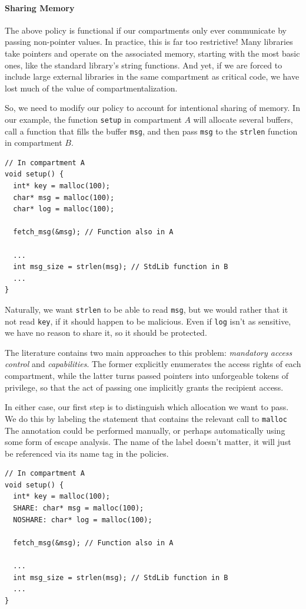 \documentclass[acmsmall,review,anonymous]{acmart}\settopmatter{printfolios=true,printccs=false,printacmref=false}
\begin{document}
\paragraph{Sharing Memory}

The above policy is functional if our compartments only ever communicate by passing
non-pointer values. In practice, this is far too restrictive! Many libraries take pointers
and operate on the associated memory, starting with the most basic ones, like the
standard library's string functions. And yet, if we are forced to include large
external libraries in the same compartment as critical code, we have lost much of
the value of compartmentalization.

So, we need to modify our policy to account for intentional sharing of memory.
In our example, the function {\tt setup} in compartment \(A\) will allocate several
buffers, call a function that fills the buffer {\tt msg}, and then pass {\tt msg}
to the {\tt strlen} function in compartment \(B\).

\begin{verbatim}
// In compartment A
void setup() {
  int* key = malloc(100);
  char* msg = malloc(100);
  char* log = malloc(100);

  fetch_msg(&msg); // Function also in A

  ...
  int msg_size = strlen(msg); // StdLib function in B
  ...
}
\end{verbatim}

Naturally, we want {\tt strlen} to be able to read {\tt msg}, but we would
rather that it not read {\tt key}, if it should happen to be malicious.
Even if {\tt log} isn't as sensitive, we have no reason to share it, so
it should be protected.

The literature contains two main approaches to this problem:
{\em mandatory access control} and {\em capabilities}. The former explicitly
enumerates the access rights of each compartment, while the latter turns passed
pointers into unforgeable tokens of privilege, so that the act of passing one
implicitly grants the recipient access.

In either case, our first step is to distinguish which allocation we want to pass.
We do this by labeling the statement that contains the relevant call to {\tt malloc}
The annotation could be performed manually, or perhaps automatically using some form
of escape analysis. The name of the label doesn't matter, it will just be referenced
via its name tag in the policies.

\begin{verbatim}
// In compartment A
void setup() {
  int* key = malloc(100);
  SHARE: char* msg = malloc(100);
  NOSHARE: char* log = malloc(100);

  fetch_msg(&msg); // Function also in A

  ...
  int msg_size = strlen(msg); // StdLib function in B
  ...
}
\end{verbatim}
\end{document}

